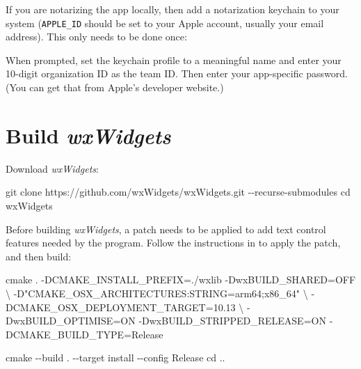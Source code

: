 \documentclass[
  letterpaper,
]{LegrandOrangeBook}
\newenvironment{Shaded}{\begin{snugshade}}{\end{snugshade}}
\newcommand{\AttributeTok}[1]{\textcolor[rgb]{0.40,0.45,0.13}{#1}}
\newcommand{\BuiltInTok}[1]{\textcolor[rgb]{0.00,0.23,0.31}{#1}}
\newcommand{\DataTypeTok}[1]{\textcolor[rgb]{0.68,0.00,0.00}{#1}}
\newcommand{\ExtensionTok}[1]{\textcolor[rgb]{0.00,0.23,0.31}{#1}}
\newcommand{\FunctionTok}[1]{\textcolor[rgb]{0.28,0.35,0.67}{#1}}
\newcommand{\NormalTok}[1]{\textcolor[rgb]{0.00,0.23,0.31}{#1}}
\newcommand{\OperatorTok}[1]{\textcolor[rgb]{0.37,0.37,0.37}{#1}}
\newcommand{\StringTok}[1]{\textcolor[rgb]{0.13,0.47,0.30}{#1}}
\newcommand{\VariableTok}[1]{\textcolor[rgb]{0.07,0.07,0.07}{#1}}
\begin{document}
If you are notarizing the app locally, then add a notarization keychain
to your system (\texttt{APPLE\_ID} should be set to your Apple account,
usually your email address). This only needs to be done once:

\begin{Shaded}
\end{Shaded}

When prompted, set the keychain profile to a meaningful name and enter
your 10-digit organization ID as the team ID. Then enter your
app-specific password. (You can get that from Apple's developer
website.)

\newpage{}

\section*{\texorpdfstring{Build
\emph{wxWidgets}}{Build wxWidgets}}\label{build-wxwidgets-1}


Download \emph{wxWidgets}:

\begin{Shaded}
\begin{Highlighting}[]
\FunctionTok{git}\NormalTok{ clone https://github.com/wxWidgets/wxWidgets.git }\AttributeTok{{-}{-}recurse{-}submodules}
\BuiltInTok{cd}\NormalTok{ wxWidgets}
\end{Highlighting}
\end{Shaded}

Before building \emph{wxWidgets}, a patch needs to be applied to add
text control features needed by the program. Follow the instructions in
 to apply the patch, and
then build:

\begin{Shaded}
\begin{Highlighting}[]
\FunctionTok{cmake}\NormalTok{ . }\AttributeTok{{-}DCMAKE\_INSTALL\_PREFIX}\OperatorTok{=}\NormalTok{./wxlib }\AttributeTok{{-}DwxBUILD\_SHARED}\OperatorTok{=}\NormalTok{OFF }\DataTypeTok{\textbackslash{}}
    \AttributeTok{{-}D}\StringTok{"CMAKE\_OSX\_ARCHITECTURES:STRING=arm64;x86\_64"} \DataTypeTok{\textbackslash{}}
    \AttributeTok{{-}DCMAKE\_OSX\_DEPLOYMENT\_TARGET}\OperatorTok{=}\NormalTok{10.13 }\DataTypeTok{\textbackslash{}}
    \AttributeTok{{-}DwxBUILD\_OPTIMISE}\OperatorTok{=}\NormalTok{ON }\AttributeTok{{-}DwxBUILD\_STRIPPED\_RELEASE}\OperatorTok{=}\NormalTok{ON }\AttributeTok{{-}DCMAKE\_BUILD\_TYPE}\OperatorTok{=}\NormalTok{Release}

\FunctionTok{cmake} \AttributeTok{{-}{-}build}\NormalTok{ . }\AttributeTok{{-}{-}target}\NormalTok{ install }\AttributeTok{{-}{-}config}\NormalTok{ Release}
\BuiltInTok{cd}\NormalTok{ ..}
\end{Highlighting}
\end{Shaded}
\end{document}
